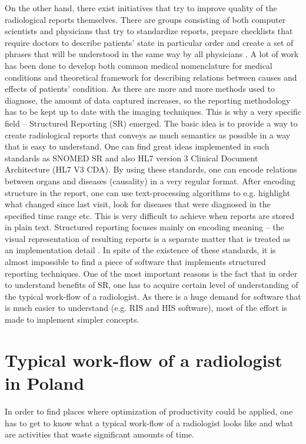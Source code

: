 \documentclass[12pt, twoside, openany]{report}
\theoremstyle{definition}
\begin{document}
On the other hand, there exist initiatives that try to improve quality of the radiological reports themselves. There are groups consisting of both computer scientists and physicians that try to standardize reports, prepare checklists that require doctors to describe patients' state in particular order and create a set of phrases that will be understood in the same way by all physicians \cite{snomed}. A lot of work has been done to develop both common medical nomenclature for medical conditions and theoretical framework for describing relations between causes and effects of patients' condition. As there are more and more methods used to diagnose, the amount of data captured increases, so the reporting methodology has to be kept up to date with the imaging techniques. This is why a very specific field -- Structured Reporting (SR) emerged. The basic idea is to provide a way to create radiological reports that conveys as much semantics as possible in a way that is easy to understand. One can find great ideas implemented in such standards as SNOMED SR \cite{sr} and also HL7 version 3 Clinical Document Architecture (HL7 V3 CDA). By using these standards, one can encode relations between organs and diseases (causality) in a very regular format. After encoding structure in the report, one can use text-processing algorithms to e.g. highlight what changed since last visit, look for diseases that were diagnosed in the specified time range etc. This is very difficult to achieve when reports are stored in plain text. Structured reporting focuses mainly on encoding meaning -- the visual representation of resulting reports is a separate matter that is treated as an implementation detail \cite{sr}.
In spite of the existence of these standards, it is almost impossible to find a piece of software that implements structured reporting techniques. One of the most important reasons is the fact that in order to understand benefits of SR, one has to acquire certain level of understanding of the typical work-flow of a radiologist. As there is a huge demand for software that is much easier to understand (e.g. RIS and HIS software), most of the effort is made to implement simpler concepts.

\section{Typical work-flow of a radiologist in Poland}
In order to find places where optimization of productivity could be applied, one has to get to know what a typical work-flow of a radiologist looks like and what are activities that waste significant amounts of time. 
\end{document}
